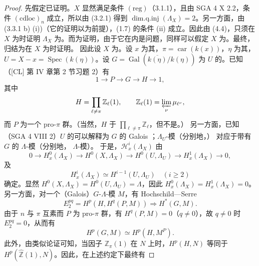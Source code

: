 \begin{proof}
先假定已证明。$X$ 显然满足条件 $(\mathrm{reg})$（3.1.1），且由 SGA 4 X 2.2，条件 $(\mathrm{cdloc})_n$ 成立，所以由 (3.2.1) 得到 $\operatorname{dim.q.inj}(\Lambda_X)=2$。另一方面，由 (3.3.1 b) (i))（它的证明以为前提），(1.7) 的条件 (ii) 成立。因此由 (4.4)，只须在 $X$ 为时证明 $\Lambda_X$ 为。而为证明，由于它在内是问题，同样可以假定 $X$ 为。最终，归结为在 $X$ 为时证明。
因此设 $X$ 为。设 $x$ 为其，$\pi=\operatorname{car}(k(x))$，$\eta$ 为其，$U=X-x=\operatorname{Spec}(k(\eta))$。设 $G=\operatorname{Gal}(\overline{k(\eta)}/k(\eta))$ 为 $U$ 的。已知（[CL] 第 IV 章第 2 节习题 2）有
\[
1\longrightarrow P\longrightarrow G\longrightarrow H\longrightarrow1,\tag{5.1.1}
\]
其中
\[
H=\prod_{\ell\ne\pi}\mathbb Z_\ell(1),\qquad
\mathbb Z_\ell(1)=\varprojlim_\nu\mu_{\ell^\nu},
\]
而 $P$ 为一个 pro-$\pi$ 群。（当然，$H$ 于 $\prod_{\ell\ne\pi}\mathbb Z_\ell$，但不是。）
另一方面，已知（SGA 4 VIII 2）$U$ 的可以解释为 $G$ 的 Galois ；$\Lambda_U$-模（分别地，）
对应于带有 $G$ 的 $\Lambda$-模（分别地， $\Lambda$-模）。
于是，$\mathscr H_x^i(\Lambda_X)$ 由
\[
0\longrightarrow H_x^0(\Lambda_X)\longrightarrow H^0(X,\Lambda_X)\longrightarrow H^0(U,\Lambda_U)\longrightarrow H_x^1(\Lambda_X)\longrightarrow0,\tag{5.1.2}
\]
及
\[
H_x^i(\Lambda_X)\simeq H^{i-1}(U,\Lambda_U)\quad(i\geq2)\tag{5.1.3}
\]
确定。显然 $H^0(X,\Lambda_X)=H^0(U,\Lambda_U)=\Lambda$，因此 $H_x^0(\Lambda_X)=H_x^1(\Lambda_X)=0$。
另一方面，对一个（Galois）$G$-$\Lambda$-模 $M$，有 Hochschild—Serre 
\[
E_2^{pq}=H^p(H,H^q(P,M))\Longrightarrow H^*(G,M).
\]
由于 $n$ 与 $\pi$ 互素而 $P$ 为 pro-$\pi$ 群，有 $H^q(P,M)=0$（$q\ne0$），故 $q\ne0$ 时 $E_2^{pq}=0$，从而有
\[
H^p(G,M)\simeq H^p(H,M^P).\tag{5.1.4}
\]
此外，由类似论证可知，当因子 $\mathbb Z_\pi(1)$ 在 $N$ 上时，$H^p(H,N)$ 等同于 $H^p(\widehat{\mathbb Z}(1),N)$。因此，在上述约定下最终有

\end{proof}
